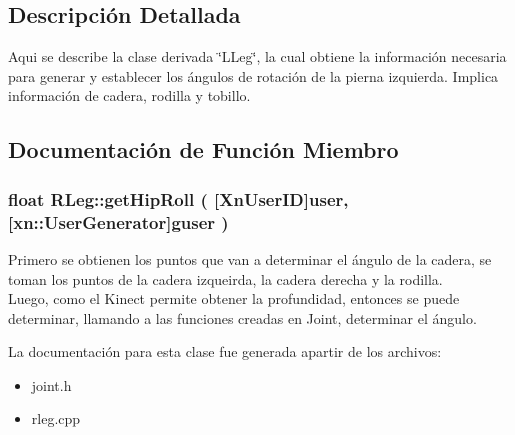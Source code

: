 \subsection{\-Descripción \-Detallada}
\-Aqui se describe la clase derivada \char`\"{}\-LLeg\char`\"{}, la cual obtiene la información necesaria para generar y establecer los ángulos de rotación de la pierna izquierda. Implica información de cadera, rodilla y tobillo.

\subsection{\-Documentación de \-Función \-Miembro}
\hypertarget{class_r_leg_a983e8da29c577737694dc72a9573fc5c}{
\subsubsection[{get\-Hip\-Roll}]{\setlength{\rightskip}{0pt plus 5cm}float {\bf \-R\-Leg\-::get\-Hip\-Roll} (
[{\-Xn\-User\-I\-D}]{user, }
[{xn\-::\-User\-Generator}]{guser}
)}}\label{class_r_leg_a983e8da29c577737694dc72a9573fc5c}


\-Primero se obtienen los puntos que van a determinar el ángulo de la cadera, se toman los puntos de la cadera izqueirda, la cadera derecha y la rodilla.\\
\-Luego, como el Kinect permite obtener la profundidad, entonces se puede determinar, llamando a las funciones creadas en Joint, determinar el ángulo. 

\-La documentación para esta clase fue generada apartir de los archivos\-:\begin{itemize}
\item 
joint.\-h\item 
rleg.\-cpp\end{itemize}
